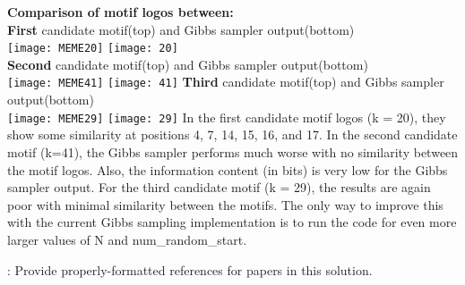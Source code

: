 \documentclass[solution,addpoints,12pt]{exam}
\begin{document}
\begin{questions}
\begin{parts}
\begin{solution}
\textbf{Comparison of motif logos between:}
\\
\textbf{First} candidate motif(top) and Gibbs sampler output(bottom)
\vspace{2mm}
\\
\texttt{[image: MEME20]}
\texttt{[image: 20]}
\vspace{2mm}
\\
\textbf{Second} candidate motif(top) and Gibbs sampler output(bottom)\\
\texttt{[image: MEME41]}
\texttt{[image: 41]}
 \textbf{Third} candidate motif(top) and Gibbs sampler output(bottom)
\vspace{2mm}
\\
\texttt{[image: MEME29]}
\texttt{[image: 29]}
In the first candidate motif logos (k = 20), they show some similarity at positions 4, 7, 14, 15, 16, and 17. In the second candidate motif (k=41), the Gibbs sampler performs much worse with no similarity between the motif logos. Also, the information content (in bits) is very low for the Gibbs sampler output. For the third candidate motif (k = 29), the results are again poor with minimal similarity between the motifs. The only way to improve this with the current Gibbs sampling implementation is to run the code for even more larger values of N and num\_random\_start.
\end{solution}
\end{parts}


: Provide properly-formatted references for papers in this solution.
\end{questions}
\end{document}
